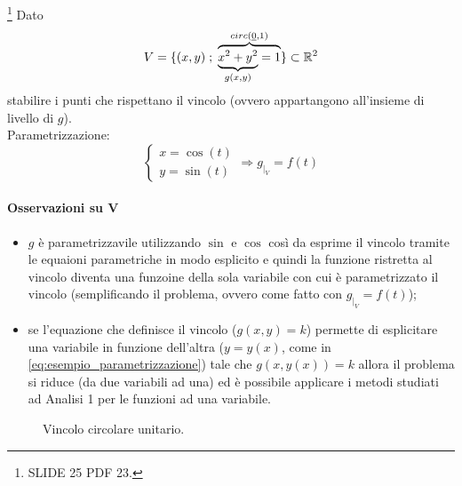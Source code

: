 \begin{example}\label{ex:parametrizzazione_funzione_vincolo}
	\footnote{SLIDE 25 PDF 23.}  Dato
	\begin{equation*}
		V = \{(x,y)\;;\; \overbrace{\underbrace{x^2+y^2}_{g(x,y)} = 1}^{circ(\uline 0, 1)}\} \subset \mathbb{R}^2
	\end{equation*}
	stabilire i punti che rispettano il vincolo (ovvero appartangono all'insieme di livello di $g$).\\
	Parametrizzazione:
	\begin{equation}\label{eq:esempio_parametrizzazione}
		\begin{cases}
			x = \cos(t)\\
			y= \sin(t)
		\end{cases}
		\Rightarrow g_{|_V} = f(t)
	\end{equation}
	\paragraph{Osservazioni su $\boldsymbol{V}$}
	 \begin{itemize}
	 	\item $g$ è parametrizzavile utilizzando $\sin$ e $\cos$ così da esprime il vincolo tramite le equaioni parametriche in modo esplicito e quindi la funzione ristretta al vincolo diventa una funzoine della sola variabile con cui è parametrizzato il vincolo (semplificando il problema, ovvero come fatto con $g_{|_V} = f(t)$);
	 	\item se l'equazione che definisce il vincolo ($g(x,y)=k$) permette di esplicitare una variabile in funzione dell'altra ($y=y(x)$, come in \ref{eq:esempio_parametrizzazione}) tale che $g(x, y(x))=k$ allora il problema si riduce (da due variabili ad una) ed è possibile applicare i metodi studiati ad Analisi 1 per le funzioni ad una variabile.
	 \end{itemize}
	 
	 \begin{figure}[ht]
	 	\centering
	 	\caption{Vincolo circolare unitario.}
	 \end{figure}
\end{example}
